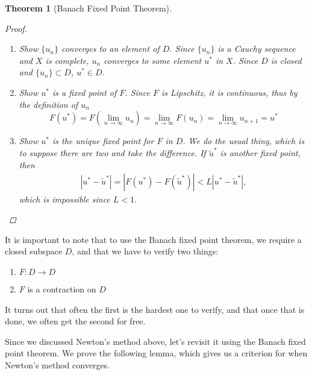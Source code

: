 \documentclass[12pt]{amsart}         %
\newtheorem{theorem}{Theorem}[section]
\theoremstyle{remark}
\begin{document}
\begin{theorem}[Banach Fixed Point Theorem]
\begin{proof}
\begin{enumerate}
	\item Show $\{ u_n \}$ converges to an element of $D$. Since $\{ u_n \}$ is a Cauchy sequence and $X$ is complete, $u_n$ converges to some element $u^*$ in $X$. Since $D$ is closed and $\{u_n\} \subset D$, $u^* \in D$.
	
	\item Show $u^*$ is a fixed point of $F$. Since $F$ is Lipschitz, it is continuous, thus by the definition of $u_n$
	\[
	F(u^*) = F\left(\lim_{n\rightarrow \infty} u_n\right) = \lim_{n \rightarrow \infty} F(u_n) 
	= \lim_{n \rightarrow \infty} u_{n+1} = u^*
	\]

	\item Show $u^*$ is the unique fixed point for $F$ in $D$. We do the usual thing, which is to suppose there are two and take the difference. If $\tilde{u}^*$ is another fixed point, then
	\begin{align*}
	|u^* - \tilde{u}^*| = |F(u^*) - F(\tilde{u}^*)| < L|u^* - \tilde{u}^*|,
	\end{align*}
	which is impossible since $L < 1$.
\end{enumerate}
\end{proof}
\end{theorem}

It is important to note that to use the Banach fixed point theorem, we require a closed subspace $D$, and that we have to verify two things:
\begin{enumerate}
    \item $F: D \rightarrow D$
    \item $F$ is a contraction on $D$
\end{enumerate}
It turns out that often the first is the hardest one to verify, and that once that is done, we often get the second for free.

Since we discussed Newton's method above, let's revisit it using the Banach fixed point theorem. We prove the following lemma, which gives us a criterion for when Newton's method converges.
\end{document}
